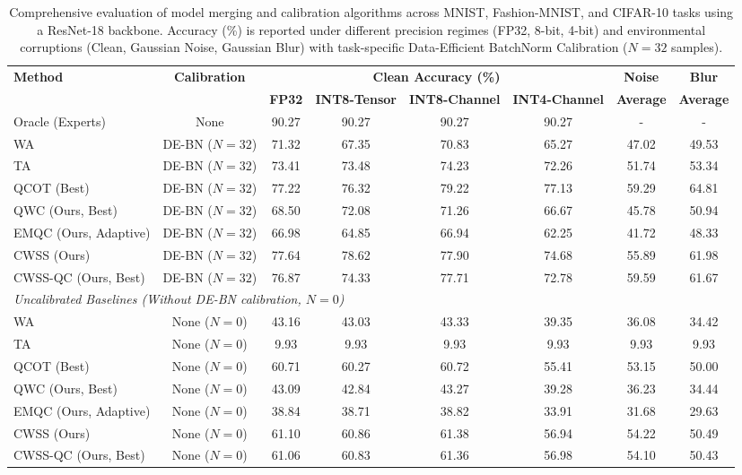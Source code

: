\begin{table}[t]
\centering
\caption{Comprehensive evaluation of model merging and calibration algorithms across MNIST, Fashion-MNIST, and CIFAR-10 tasks using a ResNet-18 backbone. Accuracy (\%) is reported under different precision regimes (FP32, 8-bit, 4-bit) and environmental corruptions (Clean, Gaussian Noise, Gaussian Blur) with task-specific Data-Efficient BatchNorm Calibration ($N=32$ samples).}
\label{tab:main_results}
\small
\setlength{\tabcolsep}{4.0pt}
\begin{tabular}{l c cccc cc}
\hline
\textbf{Method} & \textbf{Calibration} & \multicolumn{4}{c}{\textbf{Clean Accuracy (\%)}} & \textbf{Noise} & \textbf{Blur} \\
\cline{3-6}
& & \textbf{FP32} & \textbf{INT8-Tensor} & \textbf{INT8-Channel} & \textbf{INT4-Channel} & \textbf{Average} & \textbf{Average} \\
\hline
Oracle (Experts) & None & 90.27 & 90.27 & 90.27 & 90.27 & - & - \\
\hline
WA & DE-BN ($N=32$) & 71.32 & 67.35 & 70.83 & 65.27 & 47.02 & 49.53 \\
TA & DE-BN ($N=32$) & 73.41 & 73.48 & 74.23 & 72.26 & 51.74 & 53.34 \\
QCOT (Best) & DE-BN ($N=32$) & 77.22 & 76.32 & 79.22 & 77.13 & 59.29 & 64.81 \\
QWC (Ours, Best) & DE-BN ($N=32$) & 68.50 & 72.08 & 71.26 & 66.67 & 45.78 & 50.94 \\
EMQC (Ours, Adaptive) & DE-BN ($N=32$) & 66.98 & 64.85 & 66.94 & 62.25 & 41.72 & 48.33 \\
CWSS (Ours) & DE-BN ($N=32$) & 77.64 & 78.62 & 77.90 & 74.68 & 55.89 & 61.98 \\
CWSS-QC (Ours, Best) & DE-BN ($N=32$) & 76.87 & 74.33 & 77.71 & 72.78 & 59.59 & 61.67 \\
\hline
\multicolumn{8}{l}{\textit{Uncalibrated Baselines (Without DE-BN calibration, $N=0$)}}\\
WA & None ($N=0$) & 43.16 & 43.03 & 43.33 & 39.35 & 36.08 & 34.42 \\
TA & None ($N=0$) & 9.93 & 9.93 & 9.93 & 9.93 & 9.93 & 9.93 \\
QCOT (Best) & None ($N=0$) & 60.71 & 60.27 & 60.72 & 55.41 & 53.15 & 50.00 \\
QWC (Ours, Best) & None ($N=0$) & 43.09 & 42.84 & 43.27 & 39.28 & 36.23 & 34.44 \\
EMQC (Ours, Adaptive) & None ($N=0$) & 38.84 & 38.71 & 38.82 & 33.91 & 31.68 & 29.63 \\
CWSS (Ours) & None ($N=0$) & 61.10 & 60.86 & 61.38 & 56.94 & 54.22 & 50.49 \\
CWSS-QC (Ours, Best) & None ($N=0$) & 61.06 & 60.83 & 61.36 & 56.98 & 54.10 & 50.43 \\
\hline
\end{tabular}
\end{table}
